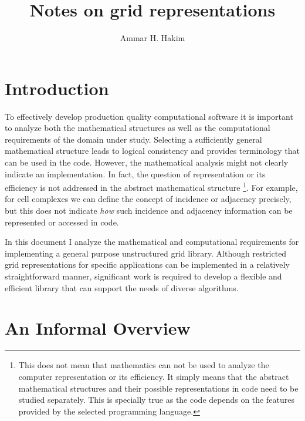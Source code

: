 \documentclass[11pt, reqno]{amsart}
\title[Grid Representation]{Notes on grid representations}%
\author{Ammar H. Hakim}%
\date{}
\theoremstyle{definition}
\begin{document}
\maketitle


\section{Introduction}

To effectively develop production quality computational software it is
important to analyze both the mathematical structures as well as the
computational requirements of the domain under study. Selecting a
sufficiently general mathematical structure leads to logical
consistency and provides terminology that can be used in the
code. However, the mathematical analysis might not clearly indicate an
implementation. In fact, the question of representation or its
efficiency is not addressed in the abstract mathematical structure
\footnote{This does not mean that mathematics can not be used to
  analyze the computer representation or its efficiency. It simply
  means that the abstract mathematical structures and their possible
  representations in code need to be studied separately. This is
  specially true as the code depends on the features provided by the
  selected programming language.}. For example, for cell complexes we
can define the concept of incidence or adjacency precisely, but this
does not indicate \emph{how} such incidence and adjacency information
can be represented or accessed in code.

In this document I analyze the mathematical and computational
requirements for implementing a general purpose unstructured grid
library. Although restricted grid representations for specific
applications can be implemented in a relatively straightforward
manner, significant work is required to develop a flexible and
efficient library that can support the needs of diverse algorithms.


\section{An Informal Overview}
\end{document}
